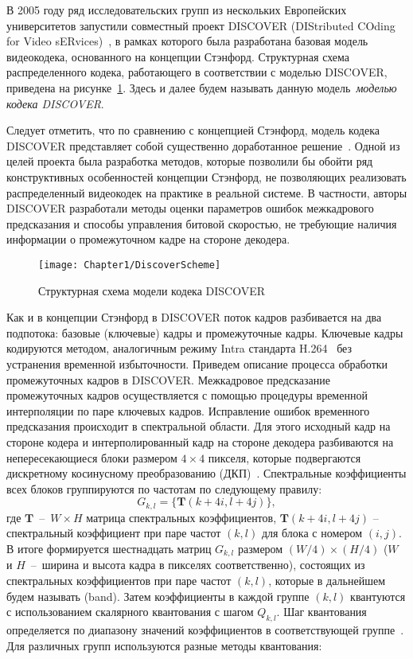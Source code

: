 В 2005 году ряд исследовательских групп из нескольких Европейских университетов запустили совместный проект DISCOVER (DIStributed COding for Video sERvices)~\cite{Artigas2007}, в рамках которого была разработана базовая модель видеокодека, основанного на концепции Стэнфорд. Структурная схема распределенного кодека, работающего в соответствии с моделью DISCOVER, приведена на рисунке~\ref{fig:DiscoverScheme}. Здесь и далее будем называть данную модель~\emph{моделью кодека DISCOVER}.
 
Следует отметить, что по сравнению с концепцией Стэнфорд, модель кодека DISCOVER представляет собой существенно доработанное решение~\cite{opac-b1132593}. Одной из целей проекта была разработка методов, которые позволили бы обойти ряд конструктивных особенностей концепции Стэнфорд, не позволяющих реализовать распределенный видеокодек на практике в реальной системе. В частности, авторы DISCOVER разработали методы оценки параметров ошибок межкадрового предсказания и способы управления битовой скоростью, не требующие наличия информации о промежуточном кадре на стороне декодера. 

\begin{figure}[htbp]
\begin{center}
\texttt{[image: Chapter1/DiscoverScheme]}
\caption{Структурная схема модели кодека DISCOVER}
\label{fig:DiscoverScheme}
\end{center}
\end{figure}

Как и в концепции Стэнфорд в DISCOVER поток кадров разбивается на два подпотока: базовые (ключевые) кадры и промежуточные кадры. Ключевые кадры кодируются методом, аналогичным режиму Intra стандарта H.264~\cite{Wiegand2003} без устранения временной избыточности. Приведем описание процесса обработки промежуточных кадров в DISCOVER. Межкадровое предсказание промежуточных кадров осуществляется с помощью процедуры временной интерполяции по паре ключевых кадров. Исправление ошибок временного предсказания происходит в спектральной области. Для этого исходный кадр на стороне кодера и интерполированный кадр на стороне декодера разбиваются на непересекающиеся блоки размером $4\times4$ пикселя, которые подвергаются дискретному косинусному преобразованию (ДКП)~\cite{Khayam03thediscrete}. Спектральные коэффициенты всех блоков группируются по частотам по следующему правилу:
\begin{equation*}
G_{k,l} = \{\mathbf{T}(k+4i,l+4j)\},
\end{equation*}
где $\mathbf{T}$~--~$W\times H $ матрица спектральных коэффициентов, $\mathbf{T}(k+4i,l+4j)$ – спектральный коэффициент при паре частот $(k,l)$ для блока с номером $(i,j)$. В итоге формируется шестнадцать матриц $G_{k,l}$  размером  $(W/4) \times (H/4)$ ($W$ и $H$~--~ширина и высота кадра в пикселях соответственно), состоящих из спектральных коэффициентов при паре частот $(k,l)$, которые в дальнейшем будем называть  (band). Затем коэффициенты в каждой группе $(k,l)$ квантуются с использованием  скалярного квантования с шагом $Q_{k,l}$. Шаг квантования определяется по диапазону значений коэффициентов в соответствующей группе~\cite{Kubasov2007}. Для различных групп используются разные методы квантования:

